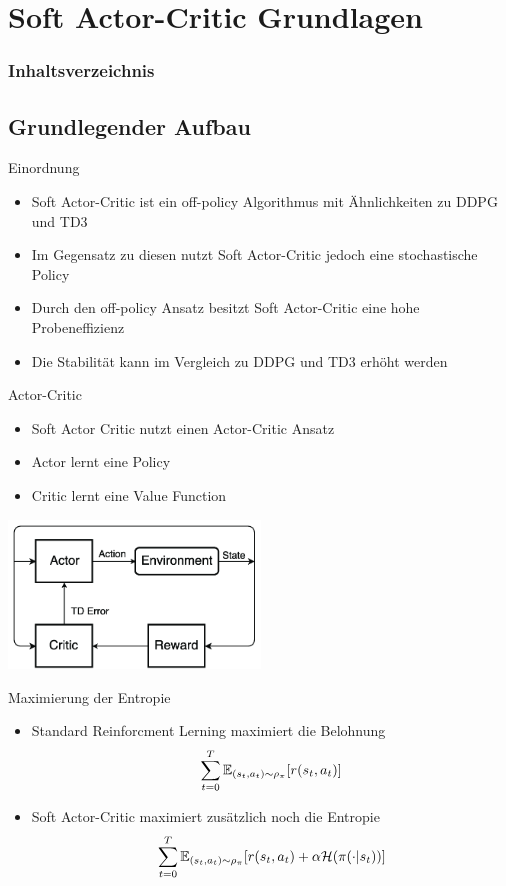 \section{Soft Actor-Critic Grundlagen}
\begin{frame}
    \frametitle{Inhaltsverzeichnis}
    \tableofcontents[currentsection]
\end{frame}

\subsection{Grundlegender Aufbau}
\begin{frame}{Einordnung}
	\begin{itemize}
		\item Soft Actor-Critic ist ein off-policy Algorithmus mit Ähnlichkeiten zu DDPG und TD3  
		\item Im Gegensatz zu diesen nutzt Soft Actor-Critic jedoch eine stochastische Policy
		\item Durch den off-policy Ansatz besitzt Soft Actor-Critic eine hohe Probeneffizienz 
		\item Die Stabilität kann im Vergleich zu DDPG und TD3 erhöht werden 
	\end{itemize} 
\end{frame}


\begin{frame}{Actor-Critic}
	\begin{itemize}
		\item Soft Actor Critic nutzt einen Actor-Critic Ansatz
		\item Actor lernt eine Policy
		\item Critic lernt eine Value Function
	\end{itemize} 
	\includegraphics[width=190pt]{figures/A-regular-actor-critic-model-TD-temporal-difference.png}
\end{frame}

\begin{frame}{Maximierung der Entropie}
	\begin{itemize}
		\item Standard Reinforcment Lerning maximiert die Belohnung
		\begin{equation}
			\sum_{t=0}^T \mathbb{E}_{(s_t,a_t)\sim\rho_\pi}[{\mathnormal{r}(s_t,a_t)}] \notag
		\end{equation}
		\item Soft Actor-Critic maximiert zusätzlich noch die Entropie
		\begin{equation}
			\sum_{t=0}^T \mathbb{E}_{(s_t,a_t)\sim\rho_\pi}[{\mathnormal{r}(s_t,a_t)} + \alpha \mathcal{H}(\pi(\cdot|s_t))] \notag
		\end{equation}
	\end{itemize} 
\end{frame}

